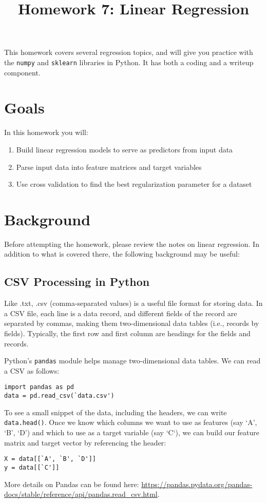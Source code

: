 \documentclass[10pt]{article}
\begin{document}
\title{\textbf{Homework 7: Linear Regression}}
\date{ }
\maketitle

This homework covers several regression topics, and will give you practice with the {\tt numpy} and {\tt sklearn} libraries in Python. It has both a coding and a writeup component.

\section{Goals}
In this homework you will:
\begin{enumerate}
\item Build linear regression models to serve as predictors from input data
\item Parse input data into feature matrices and target variables
\item Use cross validation to find the best regularization parameter for a dataset
\end{enumerate}

\section{Background}
Before attempting the homework, please review the notes on linear regression. In addition to what is covered there, the following background may be useful:

\subsection{CSV Processing in Python}
Like .txt, .csv (comma-separated values) is a useful file format for storing data. In a CSV file, each line is a data record, and different fields of the record are separated by commas, making them two-dimensional data tables (i.e., records by fields). Typically, the first row and first column are headings for the fields and records.

Python's {\tt pandas} module helps manage two-dimensional data tables. We can read a CSV as follows:
\begin{verbatim}
import pandas as pd
data = pd.read_csv(`data.csv')
\end{verbatim}
To see a small snippet of the data, including the headers, we can write {\tt data.head()}. Once we know which columns we want to use as features (say `A', `B', `D') and which to use as a target variable (say `C`), we can build our feature matrix and target vector by referencing the header:
\begin{verbatim}
X = data[[`A', `B', `D']]
y = data[[`C']]
\end{verbatim}
More details on Pandas can be found here: \url{https://pandas.pydata.org/pandas-docs/stable/reference/api/pandas.read_csv.html}.
\end{document}
